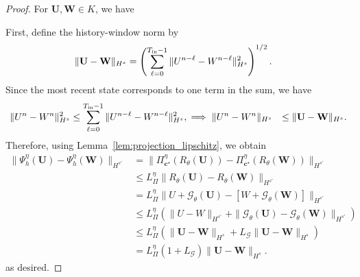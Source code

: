 \documentclass[11pt,a4paper]{article}
\theoremstyle{definition}
\theoremstyle{remark}
\numberwithin{equation}{section}
\numberwithin{figure}{section}
\numberwithin{table}{section}
\begin{document}
\begin{proof}
For \(\mathbf U,\mathbf W\in K\), we have


First, define the history-window norm by
\[
\begin{aligned}
    \|\mathbf U-\mathbf W\|_{H^s}
    &=
    \left(
    \sum_{\ell=0}^{T_{\rm in}-1}
    \|U^{n-\ell}-W^{n-\ell}\|_{H^s}^2
    \right)^{1/2}.
\end{aligned}
\]
Since the most recent state corresponds to one term in the sum, we have
\[
\begin{aligned}
    \|U^n-W^n\|_{H^s}^2
    &\le
    \sum_{\ell=0}^{T_{\rm in}-1}
    \|U^{n-\ell}-W^{n-\ell}\|_{H^s}^2, \implies \|U^n-W^n\|_{H^s}
    &\le
    \|\mathbf U-\mathbf W\|_{H^s}.
\end{aligned}
\]
Therefore, using Lemma~\ref{lem:projection_lipschitz}, we obtain
\[
\begin{aligned}
    \|\Psi_h^\eta(\mathbf U)-\Psi_h^\eta(\mathbf W)\|_{H^{s'}}
    &=
    \|\Pi_{\mathbf c^\star}^{\eta}(R_\theta(\mathbf U))
    -
    \Pi_{\mathbf c^\star}^{\eta}(R_\theta(\mathbf W))\|_{H^{s'}} \\
    &\le
    L_\Pi^\eta
    \|R_\theta(\mathbf U)-R_\theta(\mathbf W)\|_{H^{s'}} \\
    &=
    L_\Pi^\eta
    \|U+\mathcal G_\theta(\mathbf U)
    -
    [W+\mathcal G_\theta(\mathbf W)]\|_{H^{s'}} \\
    &\le
    L_\Pi^\eta
    \left(
    \|U-W\|_{H^{s'}}
    +
    \|\mathcal G_\theta(\mathbf U)-\mathcal G_\theta(\mathbf W)\|_{H^{s'}}
    \right) \\
    &\le
    L_\Pi^\eta
    \left(
    \|\mathbf U-\mathbf W\|_{H^s}
    +
    L_{\mathcal G}\|\mathbf U-\mathbf W\|_{H^s}
    \right) \\
    &=
    L_\Pi^\eta(1+L_{\mathcal G})
    \|\mathbf U-\mathbf W\|_{H^s}.
\end{aligned}
\]
as desired. 
\end{proof}
\end{document}
